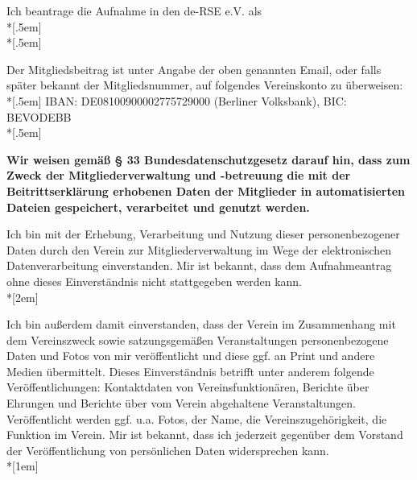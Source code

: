 \documentclass[../Vorlagen/de-RSE_Kopf,a4paper]{scrlttr2}
\begin{document}
\begin{letter}{}
%
Ich beantrage die Aufnahme in den de-RSE e.V. als\\*[.5em]
\hspace{3cm}
\\*[.5em]

Der Mitgliedsbeitrag ist unter Angabe der oben genannten Email, oder falls später bekannt der Mitgliedsnummer, auf folgendes Vereinskonto zu überweisen:\\*[.5em]
IBAN: DE08100900002775729000 (Berliner Volksbank), BIC: BEVODEBB\\*[.5em]

\clearpage

\begin{spacing}{0.5}
\textbf{
Wir weisen gemäß § 33 Bundesdatenschutzgesetz darauf hin, dass zum Zweck der Mitgliederverwaltung und -betreuung die mit der Beitrittserklärung erhobenen Daten der Mitglieder in automatisierten Dateien gespeichert, verarbeitet und genutzt werden.}

Ich bin mit der Erhebung, Verarbeitung und Nutzung dieser personenbezogener Daten durch den Verein zur Mitgliederverwaltung im Wege der elektronischen Datenverarbeitung einverstanden.
Mir ist bekannt, dass dem Aufnahmeantrag ohne dieses Einverständnis nicht stattgegeben werden kann.\\*[2em]
\end{spacing}

Ich bin außerdem damit einverstanden, dass der Verein im Zusammenhang mit dem Vereinszweck sowie satzungsgemäßen Veranstaltungen personenbezogene Daten und Fotos von mir veröffentlicht und diese ggf. an Print und andere Medien übermittelt.
Dieses Einverständnis betrifft unter anderem folgende Veröffentlichungen: Kontaktdaten von Vereinsfunktionären, Berichte über Ehrungen und Berichte über vom Verein abgehaltene Veranstaltungen.
Veröffentlicht werden ggf. u.a. Fotos, der Name, die Vereinszugehörigkeit, die Funktion im Verein.
Mir ist bekannt, dass ich jederzeit gegenüber dem Vorstand der Veröffentlichung von persönlichen Daten widersprechen kann.\\*[1em]


\end{letter}
\end{document}
